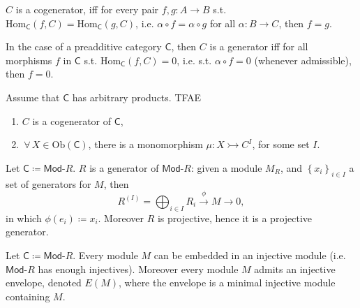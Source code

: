 \begin{rem}
	$C$ is a cogenerator, iff for every pair $f,g\colon A \to B$
	s.t. $\mathrm{Hom}_{\mathsf{C}} \left( f, C \right) = \mathrm{Hom}_{\mathsf{C}} \left( g, C \right)$,
	i.e. $\alpha \circ f = \alpha \circ g$ for all $\alpha\colon B \to C$, then $f = g$.

	In the case of a preadditive category $\mathsf{C}$, then $C$ is a generator iff
	for all morphisms $f$ in $\mathsf{C}$ s.t. $\mathrm{Hom}_{\mathsf{C}} \left( f, C \right) = 0$,
	i.e. s.t. $\alpha \circ f = 0$ (whenever admissible), then $f = 0$.
\end{rem}

\begin{prop}
	Assume that $\mathsf{C}$ has arbitrary products.
	TFAE
	\begin{enumerate}
		\item $C$ is a cogenerator of $\mathsf{C}$,
		\item $\,\forall\, X \in \mathrm{Ob} \left(\mathsf{C}\right)$, there is a monomorphism
			$\mu\colon X \rightarrowtail C^{I}$, for some set $I$.
	\end{enumerate}
\end{prop} 

\begin{ex}
	Let $\mathsf{C} \coloneqq \mathsf{Mod}\text{-}R$.
	$R$ is a generator of $\mathsf{Mod}\text{-}R$:
	given a module $M_R$, and $\left\{ x_i \right\}_{i \in I}$ a set of generators for $M$, then
	\begin{equation}
		R^{(I)} = \bigoplus_{i \in I} R_i \xrightarrow{\phi} M \to 0
	,\end{equation} 
	in which $\phi(e_i) \coloneqq x_i$.
	Moreover $R$ is projective, hence it is a projective generator.
\end{ex} 

\begin{rem}
	Let $\mathsf{C} \coloneqq \mathsf{Mod}\text{-}R$.
	Every module $M$ can be embedded in an injective module
	(i.e. $\mathsf{Mod}\text{-}R$ has enough injectives).
	Moreover every module $M$ admits an injective envelope, denoted $E(M)$,
	where the envelope is a minimal injective module containing $M$.
\end{rem}

